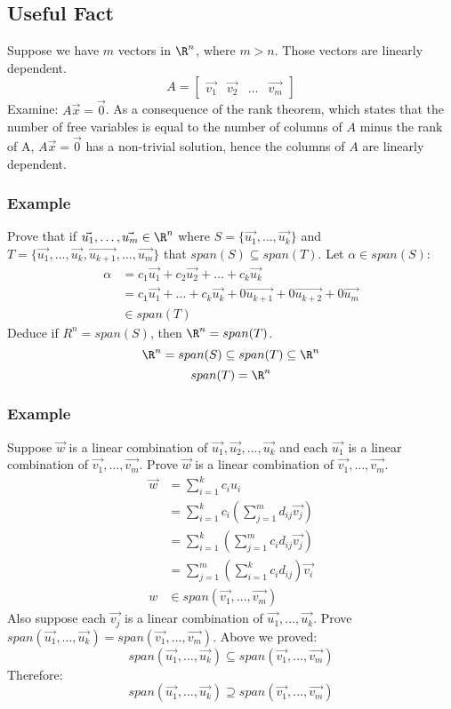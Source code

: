 \documentclass[letterpaper, 12pt]{math}
\begin{document}
\subsection*{Useful Fact}
Suppose we have \( m \) vectors in \( \R^n \), where \( m > n \). Those vectors
are linearly dependent.
\[ A = \begin{bmatrix}\vec{v_1} & \vec{v_2} & \dots & \vec{v_m}\end{bmatrix} \]
Examine: \( A\vec{x} = \vec{0} \). As a consequence of the rank theorem, which
states that the number of free variables is equal to the number of columns of
\( A \) minus the rank of A, \( A\vec{x} = \vec{0} \) has a non-trivial
solution, hence the columns of \( A \) are linearly dependent.

\subsubsection*{Example}
Prove that if \( \vec{u_1},\dots,\vec{u_m}\in\R^n \) where \( S = \{\vec{u_1},
\dots,\vec{u_k}\} \) and \( T = \{\vec{u_1},\dots,\vec{u_k},\vec{u_{k+1}},\dots,
\vec{u_m}\} \) that \( span(S)\subseteq span(T) \).
Let \( \alpha\in span(S) \):
\begin{align*}
  \alpha &= c_1\vec{u_1}+c_2\vec{u_2}+\dots+c_k\vec{u_k} \\
  &= c_1\vec{u_1}+\dots+c_k\vec{u_k}+0\vec{u_{k+1}}+0\vec{u_{k+2}}+0\vec{u_m} \\
  &\in span(T)
\end{align*}
Deduce if \( R^n = span(S) \), then \( \R^n = span(T) \).
\[ \R^n = span(S) \subseteq span(T) \subseteq \R^n \]
\[ span(T) = \R^n \]

\subsubsection*{Example}
Suppose \( \vec{w} \) is a linear combination of \( \vec{u_1},\vec{u_2},\dots,
\vec{u_k} \) and each \( \vec{u_1} \) is a linear combination of \( \vec{v_1},
\dots,\vec{v_m} \). Prove \( \vec{w} \) is a linear combination of \( \vec{v_1},
\dots,\vec{v_m} \).
\begin{align*}
  \vec{w} &= \sum_{i=1}^{k}c_iu_i \\
  &= \sum_{i=1}^{k}c_i\left(\sum_{j=1}^{m}d_{ij}\vec{v_j}\right) \\
  &= \sum_{i=1}^{k}\left(\sum_{j=1}^{m}c_id_{ij}\vec{v_j}\right) \\
  &= \sum_{j=1}^{m}\left(\sum_{i=1}^{k}c_id_{ij}\right)\vec{v_i} \\
  w &\in span(\vec{v_1},\dots,\vec{v_m})
\end{align*}
Also suppose each \( \vec{v_j} \) is a linear combination of \( \vec{u_1},\dots,
\vec{u_k} \). Prove \( span(\vec{u_1},\dots,\vec{u_k}) =
span(\vec{v_1},\dots,\vec{v_m}) \). Above we proved:
\[ span(\vec{u_1},\dots,\vec{u_k}) \subseteq span(\vec{v_1},\dots,\vec{v_m}) \]
Therefore:
\[ span(\vec{u_1},\dots,\vec{u_k}) \supseteq span(\vec{v_1},\dots,\vec{v_m}) \]
\end{document}

